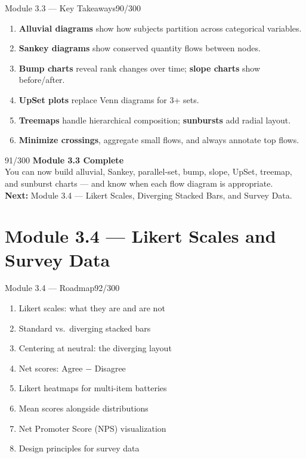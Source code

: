 \documentclass[10pt]{beamer}
\newcommand{\smark}[1]{\hfill{\scriptsize\color{codegray}#1}}
\begin{document}
\begin{frame}{Module 3.3 --- Key Takeaways}\smark{90/300}
\begin{enumerate}
    \item \textbf{Alluvial diagrams} show how subjects partition across categorical variables.
    \item \textbf{Sankey diagrams} show conserved quantity flows between nodes.
    \item \textbf{Bump charts} reveal rank changes over time; \textbf{slope charts} show before/after.
    \item \textbf{UpSet plots} replace Venn diagrams for 3+ sets.
    \item \textbf{Treemaps} handle hierarchical composition; \textbf{sunbursts} add radial layout.
    \item \textbf{Minimize crossings}, aggregate small flows, and always annotate top flows.
\end{enumerate}
\end{frame}

\begin{frame}{}\smark{91/300}
\centering\vspace{1.5cm}
{\Large\textbf{Module 3.3 Complete}}\\[0.5cm]
You can now build alluvial, Sankey, parallel-set, bump, slope, UpSet, treemap, and sunburst charts --- and know when each flow diagram is appropriate.\\[0.5cm]
\textbf{Next:} Module 3.4 --- Likert Scales, Diverging Stacked Bars, and Survey Data.
\end{frame}

\section{Module 3.4 --- Likert Scales and Survey Data}

\begin{frame}{Module 3.4 --- Roadmap}\smark{92/300}
\begin{enumerate}
    \item Likert scales: what they are and are not
    \item Standard vs.\ diverging stacked bars
    \item Centering at neutral: the diverging layout
    \item Net scores: Agree $-$ Disagree
    \item Likert heatmaps for multi-item batteries
    \item Mean scores alongside distributions
    \item Net Promoter Score (NPS) visualization
    \item Design principles for survey data
\end{enumerate}
\end{frame}
\end{document}
